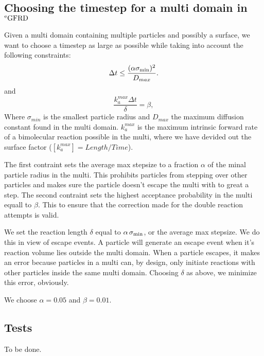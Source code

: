 \subsection{Choosing the timestep for a multi domain in $^{\rm{e}} \rm{GFRD}$}

Given a multi domain containing multiple particles and possibly a surface, we want to choose a timestep as large as possible while taking into account the following constraints:
\begin{equation}
 \Delta t \leq \frac{(\alpha \sigma_{\rm min})^2 }{D_{max}}.
\end{equation}
and
\begin{equation}
 \frac{k_{a}^{max} \Delta t}{\delta} = \beta,
\end{equation}
Where $\sigma_{min}$ is the smallest particle radius and $D_{max}$ the maximum diffusion constant found in the multi domain. $k_{a}^{max}$ is the maximum intrinsic forward rate of a bimolecular reaction possible in the multi, where we have devided out the surface factor ($[k_{a}^{max}] = Length/Time $).

The first contraint sets the average max stepsize to a fraction $\alpha$ of the minal particle radius in the multi. This prohibits particles from stepping over other particles and makes sure the particle doesn't escape the multi with to great a step. The second contraint sets the highest acceptance probability in the multi equall to $\beta$. This to ensure that the correction made for the double reaction attempts is valid. 

We set the reaction length $\delta$ equal to $\alpha \, \sigma_{\rm min}$, or the average max stepsize. We do this in view of escape events. A particle will generate an escape event when it's reaction volume lies outside the multi domain. When a particle escapes, it makes an error because particles in a multi can, by design, only initiate reactions with other particles inside the same multi domain. Choosing $\delta$ as above, we minimize this error, obviously.

We choose $\alpha = 0.05$ and $\beta = 0.01$.

\subsection{Tests}
To be done.
